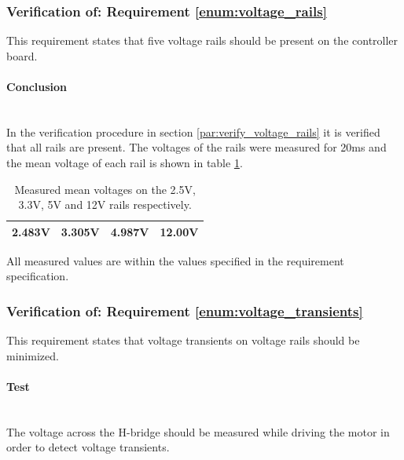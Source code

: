 \subsubsection{Verification of: Requirement \ref{enum:voltage_rails}} %
\label{ssub:requirement_enum:voltage_rails}
This requirement states that five voltage rails should be present on the controller board. 

\paragraph{Conclusion}~\\
In the verification procedure in section \ref{par:verify_voltage_rails} it is verified that all rails are present.
The voltages of the rails were measured for 20ms and the mean voltage of each rail is shown in table \ref{tab:meas_rails}.
\begin{table}[]
\centering
\begin{tabular}{|l|l|l|l|}
\hline
2.483V & 3.305V & 4.987V & 12.00V \\
\hline
\end{tabular}
\caption[Measured mean voltages on the rails.]{Measured mean voltages on the 2.5V, 3.3V, 5V and 12V rails respectively.}
\label{tab:meas_rails}
\end{table}
All measured values are within the values specified in the requirement specification.


\subsubsection{Verification of: Requirement \ref{enum:voltage_transients}} %
\label{ssub:requirement_enum:voltage_transients}
This requirement states that voltage transients on voltage rails should be minimized.

\paragraph{Test}~\\
The voltage across the H-bridge should be measured while driving the motor in order to detect voltage transients. 


